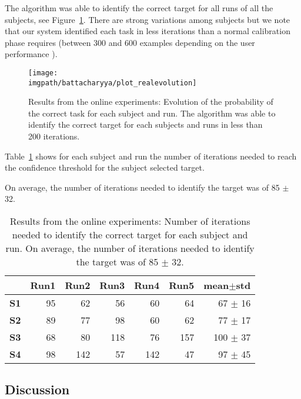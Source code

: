 The algorithm was able to identify the correct target for all runs of all the subjects, see Figure~\ref{fig:overlaponlineresults}. There are strong variations among subjects but we note that our system identified each task in less iterations than a normal calibration phase requires (between 300 and 600 examples depending on the user performance \cite{chavarriaga2010learning,iturrate2010single}).

\begin{figure}[!htbp]
    \centering
    \texttt{[image: \\imgpath/battacharyya/plot\_realevolution]}    
    \caption{Results from the online experiments: Evolution of the probability of the correct task for each subject and run. The algorithm was able to identify the correct target for each subjects and runs in less than 200 iterations.}
    \label{fig:overlaponlineresults} 
\end{figure}

Table~\ref{tab:overlaponline} shows for each subject and run the number of iterations needed to reach the confidence threshold for the subject selected target.

On average, the number of iterations needed to identify the target was of 85 $\pm$ 32.

\begin{table}[!htbp]
\centering
{}
\begin{footnotesize}
\begin{tabular}{r|rrrrr|r}
    & \textbf{Run1} & \textbf{Run2} & \textbf{Run3} & \textbf{Run4} & \textbf{Run5} & \textbf{mean$\pm$std} \\\hline
    \textbf{S1} & 95 & 62 & 56 & 60 & 64 & 67 $\pm$ 16 \\
    \textbf{S2} & 89 & 77 & 98 & 60 & 62  & 77 $\pm$ 17 \\
    \textbf{S3} & 68 & 80 & 118 & 76 & 157 & 100 $\pm$ 37 \\
    \textbf{S4} & 98 & 142 & 57 & 142 & 47 & 97 $\pm$ 45 \\
\end{tabular}
\end{footnotesize}
  \caption{Results from the online experiments: Number of iterations needed to identify the correct target for each subject and run. On average, the number of iterations needed to identify the target was of 85 $\pm$ 32.}
  \label{tab:overlaponline}
\end{table}

\subsection{Discussion}

